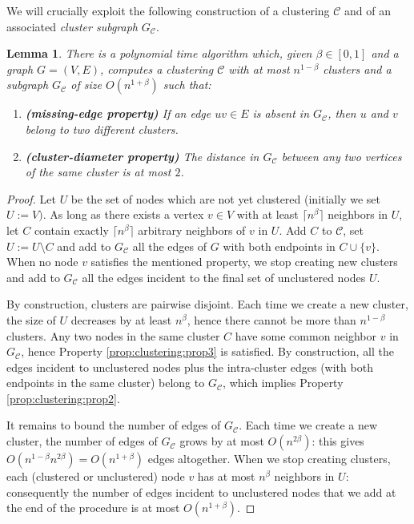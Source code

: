 \documentclass[a4paper,11pt]{article}
\newtheorem{lemma}{Lemma}[section]
\theoremstyle{definition}
\newcommand{\cC}{\mathcal{C}}
\begin{document}
We will crucially exploit the following construction of a clustering $\cC$ and of an associated \emph{cluster subgraph} $G_\cC$.

\begin{lemma}
\label{lem:clustering}
There is a polynomial time algorithm which,
given $\beta \in [0,1]$ and a graph $G=(V,E)$, computes a clustering $\cC$ with at most $n^{1-\beta}$ clusters and a subgraph $G_\cC$ of size $O(n^{1+\beta})$ such that:
\begin{enumerate}
\item \label{prop:clustering:prop2} {\bf (missing-edge property)} If an edge $uv \in E$ is absent in $G_\cC$, then $u$ and $v$ belong to two different clusters.
  \item \label{prop:clustering:prop3} {\bf (cluster-diameter property)} The distance in $G_\cC$ between any two vertices of the same cluster is at most $2$.
\end{enumerate}
\end{lemma}
\begin{proof}
Let $U$ be the set of nodes which are not yet clustered (initially we set $U:=V)$.
As long as there exists a vertex $v \in V$ with at least $\lceil n^\beta\rceil$ neighbors in $U$, let $C$ contain exactly $\lceil n^\beta \rceil$ arbitrary
neighbors of $v$ in $U$.
Add $C$ to $\cC$, set $U := U\setminus C$ and add to $G_\cC$ 
all the edges of $G$ with both endpoints in $C \cup \{v\}$. 
When no node $v$ satisfies the mentioned property, we stop creating new clusters and add to $G_\cC$ all the edges incident to the final set of unclustered nodes $U$.

By construction, clusters are pairwise disjoint. Each time we create a new cluster, the size of $U$ decreases by at least $n^\beta$, hence there cannot be more than $n^{1-\beta}$ clusters. Any two nodes in the same cluster $C$ have some common neighbor $v$ in $G_\cC$, hence Property \ref{prop:clustering:prop3} is satisfied. By construction, all the edges incident to unclustered nodes plus the intra-cluster edges (with both endpoints in the same cluster) belong to $G_{\cC}$, which implies Property \ref{prop:clustering:prop2}.

It remains to bound the number of edges of $G_{\cC}$. Each time we create a new cluster, the number of edges of $G_{\cC}$ grows by at most $O(n^{2\beta})$: this gives $O(n^{1-\beta}n^{2\beta})=O(n^{1+\beta})$ edges altogether. When we stop creating clusters, each (clustered or unclustered) node $v$ has at most $n^{\beta}$ neighbors in $U$: consequently the number of edges incident to unclustered nodes that we add at the end of the procedure is at most $O(n^{1+\beta})$.  
\end{proof}
\end{document}
